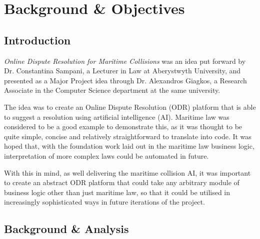 \chapter{Background \& Objectives}


\section{Introduction} %

\emph{Online Dispute Resolution for Maritime Collisions} was an idea put forward by Dr. Constantina Sampani, a Lecturer in Law at Aberystwyth University, and presented as a Major Project idea through Dr. Alexandros Giagkos, a Research Associate in the Computer Science department at the same university.

The idea was to create an Online Dispute Resolution (ODR) platform that is able to suggest a resolution using artificial intelligence (AI). Maritime law was considered to be a good example to demonstrate this, as it was thought to be quite simple, concise and relatively straightforward to translate into code. It was hoped that, with the foundation work laid out in the maritime law business logic, interpretation of more complex laws could be automated in future.

With this in mind, as well delivering the maritime collision AI, it was important to create an abstract ODR platform that could take any arbitrary module of business logic other than just maritime law, so that it could be utilised in increasingly sophisticated ways in future iterations of the project.

\section{Background \& Analysis} %

